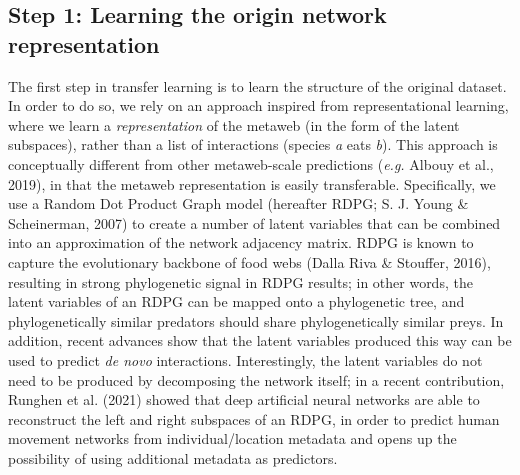 \documentclass[11pt]{article}
\begin{document}
\hypertarget{step-1-learning-the-origin-network-representation}{%
\subsection{Step 1: Learning the origin network
representation}\label{step-1-learning-the-origin-network-representation}}

The first step in transfer learning is to learn the structure of the
original dataset. In order to do so, we rely on an approach inspired
from representational learning, where we learn a \emph{representation}
of the metaweb (in the form of the latent subspaces), rather than a list
of interactions (species \emph{a} eats \emph{b}). This approach is
conceptually different from other metaweb-scale predictions (\emph{e.g.}
Albouy et al., 2019), in that the metaweb representation is easily
transferable. Specifically, we use a Random Dot Product Graph model
(hereafter RDPG; S. J. Young \& Scheinerman, 2007) to create a number of
latent variables that can be combined into an approximation of the
network adjacency matrix. RDPG is known to capture the evolutionary
backbone of food webs (Dalla Riva \& Stouffer, 2016), resulting in
strong phylogenetic signal in RDPG results; in other words, the latent
variables of an RDPG can be mapped onto a phylogenetic tree, and
phylogenetically similar predators should share phylogenetically similar
preys. In addition, recent advances show that the latent variables
produced this way can be used to predict \emph{de novo} interactions.
Interestingly, the latent variables do not need to be produced by
decomposing the network itself; in a recent contribution, Runghen et al.
(2021) showed that deep artificial neural networks are able to
reconstruct the left and right subspaces of an RDPG, in order to predict
human movement networks from individual/location metadata and opens up
the possibility of using additional metadata as predictors.
\end{document}
